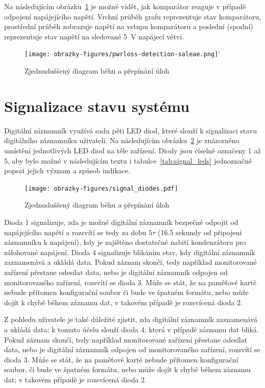 Na následujícím obrázku~\ref{fig:pwrloss-detection-saleae} je možné vidět, jak komparátor reaguje v případě odpojení napájejícího napětí. Vrchní průběh grafu reprezentuje stav komparátoru, prostřední průběh zobrazuje napětí na vstupu komparátoru a poslední (spodní) reprezentuje stav napětí na sledované \SI{5}{\volt} napájecí větvi.

\begin{figure}[h]
    \centering
    \texttt{[image: obrazky-figures/pwrloss-detection-saleae.png]}`
    
    \caption{Zjednuduššený diagram běhu a přepínání úloh}
    \label{fig:pwrloss-detection-saleae}
\end{figure}

\section{Signalizace stavu systému}
\label{signalizace_stavu_systemu}
Digitální záznamník využívá sadu pěti LED diod, které slouží k signalizaci stavu digitálního záznamníku uživateli. Na následujícím obrázku~\ref{fig:signal-diodes} je znázorněno umístění jednotlivých LED diod na těle zařízení. Diody jsou číselně označeny 1 až 5, aby bylo možné v následujícím textu i tabulce~\ref{tab:signal_leds} jednoznačně popsat jejich význam a způsob indikace.

\begin{figure}[h]
    \centering
    \texttt{[image: obrazky-figures/signal\_diodes.pdf]}
    
    \caption{Zjednuduššený diagram běhu a přepínání úloh}
    \label{fig:signal-diodes}
\end{figure}

Dioda 1 signalizuje, zda je možné digitální záznamník bezpečně odpojit od napájejícího napětí a rozsvítí se tedy za dobu $5\tau$ (16.5 sekundy od připojení záznamníku k napájení), kdy je zajištěno dostatečné nabití kondenzátoru pro zálohované napájení. Dioda 4 signalizuje blikáním stav, kdy digitální záznamník zaznamenává a ukládá data. Pokud záznam skončí, tedy například monitorované zařízení přestane odesílat data, nebo je digitální záznamník odpojen od monitorovaného zařízení, rozsvítí se dioda 3. Může se stát, že na paměťové kartě nebude přítomen konfigurační soubor či bude ve špatném formátu, nebo může dojít k chybě během záznamu dat, v takovém případě je rozsvícená dioda 2.

Z pohledu uživatele je také důležité zjistit, zda digitální záznamník zaznamenává a ukládá data; k tomuto účelu slouží dioda 4, která v případě záznamu dat bliká. Pokud záznam skončí, tedy například monitorované zařízení přestane odesílat data, nebo je digitální záznamník odpojen od monitorovaného zařízení, rozsvítí se dioda 3. Může se stát, že na paměťové kartě nebude přítomen konfigurační soubor, či bude ve špatném formátu, nebo může dojít k chybě během záznamu dat; v takovém případě je rozsvícená dioda 2.

